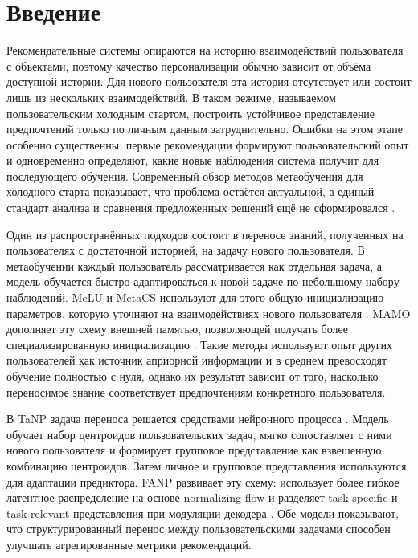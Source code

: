 \documentclass[12pt,a4paper]{article}
\begin{document}
\section{Введение}
Рекомендательные системы опираются на историю взаимодействий пользователя с
объектами, поэтому качество персонализации обычно зависит от объёма доступной
истории. Для нового пользователя эта история отсутствует или состоит лишь из
нескольких взаимодействий. В таком режиме, называемом пользовательским
холодным стартом, построить устойчивое представление предпочтений только по
личным данным затруднительно. Ошибки на этом этапе особенно существенны: первые
рекомендации формируют пользовательский опыт и одновременно определяют, какие
новые наблюдения система получит для последующего обучения. Современный обзор
методов метаобучения для холодного старта показывает, что проблема остаётся
актуальной, а единый стандарт анализа и сравнения предложенных решений ещё не
сформировался \citep{metacoldstartreview2025}.

Один из распространённых подходов состоит в переносе знаний, полученных на
пользователях с достаточной историей, на задачу нового пользователя. В
метаобучении каждый пользователь рассматривается как отдельная задача, а
модель обучается быстро адаптироваться к новой задаче по небольшому набору
наблюдений. MeLU и MetaCS используют для этого общую инициализацию параметров,
которую уточняют на взаимодействиях нового пользователя
\citep{lee2019melu,bharadhwaj2019metacs}. MAMO дополняет эту схему внешней
памятью, позволяющей получать более специализированную инициализацию
\citep{dong2020mamo}. Такие методы используют опыт других пользователей как
источник априорной информации и в среднем превосходят обучение полностью с
нуля, однако их результат зависит от того, насколько переносимое знание
соответствует предпочтениям конкретного пользователя.

В TaNP задача переноса решается средствами нейронного процесса
\citep{lin2021tanp}. Модель обучает набор центроидов пользовательских задач,
мягко сопоставляет с ними нового пользователя и формирует групповое
представление как взвешенную комбинацию центроидов. Затем личное и групповое
представления используются для адаптации предиктора. FANP развивает эту схему:
использует более гибкое латентное распределение на основе normalizing flow и
разделяет task-specific и task-relevant представления при модуляции декодера
\citep{lin2024fanp}. Обе модели показывают, что структурированный перенос
между пользовательскими задачами способен улучшать агрегированные метрики
рекомендаций.
\end{document}
